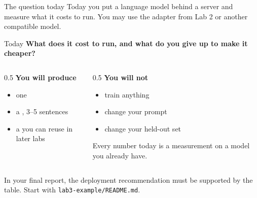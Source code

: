 \documentclass[aspectratio=169,10pt]{beamer}
\begin{document}
\begin{frame}{The question today}
  Today you put a language model behind a server and measure what it costs to
  run. You may use the adapter from Lab 2 or another compatible model.
  \vspace{0.4em}

  \begin{block}{Today}
    \textbf{What does it cost to run, and what do you give up to make it
    cheaper?}
  \end{block}
  \vspace{0.4em}

  \begin{columns}[T]
    \begin{column}{0.5\textwidth}
      \textbf{You will produce}
      \begin{itemize}
        \item one 
        \item a , 3--5 sentences
        \item a  you can reuse in later labs
      \end{itemize}
    \end{column}
    \begin{column}{0.5\textwidth}
      \textbf{You will not}
      \begin{itemize}
        \item train anything
        \item change your prompt
        \item change your held-out set
      \end{itemize}
      \vspace{0.3em}
      Every number today is a measurement on a model you already have.
    \end{column}
  \end{columns}
  \vfill
  \small In your final report, the deployment recommendation must be supported
  by the table. Start with \texttt{lab3-example/README.md}.
\end{frame}
\end{document}
